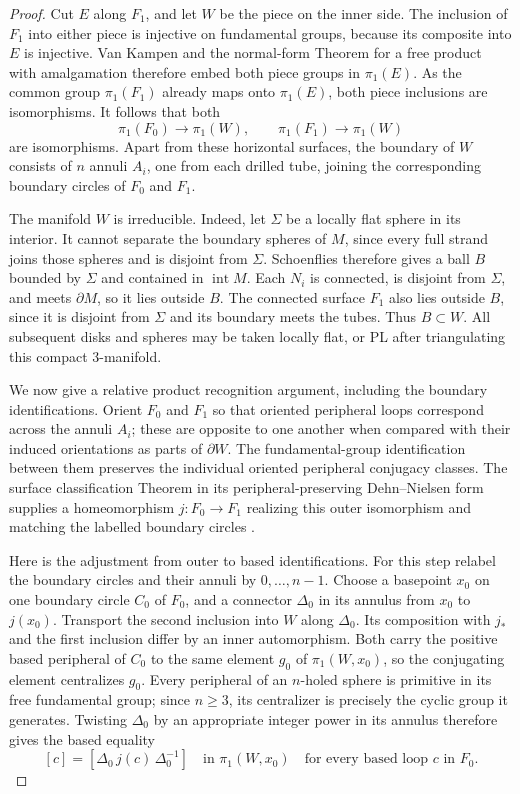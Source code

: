 \documentclass[11pt]{article}
\numberwithin{equation}{section}
\theoremstyle{definition}
\theoremstyle{remark}
\begin{document}
\begin{proof}
Cut $E$ along $F_1$, and let $W$ be the piece on the inner side.
The inclusion of $F_1$ into either piece is injective on fundamental
groups, because its composite into $E$ is injective.  Van Kampen and
the normal-form Theorem for a free product with amalgamation therefore
embed both piece groups in $\pi_1(E)$.  As the common group
$\pi_1(F_1)$ already maps onto $\pi_1(E)$, both piece inclusions are
isomorphisms.  It follows that both
\[
 \pi_1(F_0)\longrightarrow\pi_1(W),\qquad
 \pi_1(F_1)\longrightarrow\pi_1(W)
\]
are isomorphisms.  Apart from these horizontal surfaces, the boundary
of $W$ consists of $n$ annuli $A_i$, one from each drilled tube, joining
the corresponding boundary circles of $F_0$ and $F_1$.

The manifold $W$ is irreducible.  Indeed, let $\Sigma$ be a locally
flat sphere in its interior.  It cannot separate the boundary spheres
of $M$, since every full strand joins those spheres and is disjoint
from $\Sigma$.  Schoenflies therefore gives a ball $B$ bounded by
$\Sigma$ and contained in $\operatorname{int}M$.  Each $N_i$ is connected,
is disjoint from $\Sigma$, and meets $\partial M$, so it lies outside
$B$.  The connected surface $F_1$ also lies outside $B$, since it is
disjoint from $\Sigma$ and its boundary meets the tubes.  Thus
$B\subset W$.  All subsequent disks and spheres may be taken locally
flat, or PL after triangulating this compact $3$-manifold.

We now give a relative product recognition argument, including the
boundary identifications.  Orient $F_0$ and $F_1$ so that oriented
peripheral loops correspond across the annuli $A_i$; these are opposite
to one another when compared with their induced orientations as parts
of $\partial W$.  The fundamental-group identification between them
preserves the individual oriented peripheral conjugacy classes.
The surface classification Theorem in its peripheral-preserving
Dehn--Nielsen form supplies a homeomorphism
$j:F_0\to F_1$ realizing this outer isomorphism and matching the labelled
boundary circles \cite[Theorem~8.8 and Proposition~3.19]{FarbMargalit2012}.

Here is the adjustment from outer to based identifications.  For this
step relabel the boundary circles and their annuli by $0,\ldots,n-1$.
Choose
a basepoint $x_0$ on one boundary circle $C_0$ of $F_0$, and a connector
$\Delta_0$ in its annulus from $x_0$ to $j(x_0)$.  Transport the second
inclusion into $W$ along $\Delta_0$.  Its composition with $j_*$ and
the first inclusion differ by an inner automorphism.  Both carry the
positive based peripheral of $C_0$ to the same element $g_0$ of
$\pi_1(W,x_0)$, so the conjugating element centralizes $g_0$.
Every peripheral of an $n$-holed sphere is primitive in its free
fundamental group; since $n\geq3$, its centralizer is precisely the
cyclic group it generates.  Twisting $\Delta_0$ by an appropriate
integer power in its annulus therefore gives the based equality
\[
 [c]=[\Delta_0\,j(c)\,\Delta_0^{-1}]
 \quad\text{in }\pi_1(W,x_0)
 \quad\text{for every based loop }c\text{ in }F_0.
 \tag{*}
\]


\end{proof}
\end{document}
